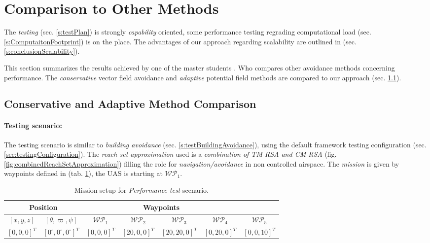 \section{Comparison to Other Methods}\label{s:OtherMethodsComparison}
\noindent The \emph{testing} (sec. \ref{s:testPlan}) is strongly \emph{capability} oriented, some performance testing regrading computational load (sec. \ref{s:ComputaitonFootprint}) is on the place. The advantages of our approach regarding scalability are outlined in (sec. \ref{s:conclusionScalability}).

This section summarizes the results achieved by one of the master students \cite{hrdlik2018}. Who compares other avoidance methods concerning performance. The  \emph{conservative }vector field avoidance \cite{borenstein1991vector} and \emph{adaptive} potential field \cite{koren1991potential} methods are compared to our approach (sec. \ref{s:conservativeComparison}).

\subsection{Conservative and Adaptive Method Comparison}\label{s:conservativeComparison}
\paragraph{Testing scenario:} The testing scenario is similar to \emph{building avoidance} (sec. \ref{s:testBuildingAvoidance}), using the default framework testing configuration (sec. \ref{sec:testingConfiguration}). The \emph{reach set approximation} used is a \emph{combination of TM-RSA and CM-RSA} (fig. \ref{fig:combinedReachSetApproximation}) filling the role for \emph{navigation/avoidance} in non controlled airspace. The \emph{mission} is given by waypoints defined in (tab. \ref{tab:missionSetupForPErformanceTest}), the UAS is starting at $\mathscr{WP}_1$.

\begin{table}[H]
	\centering
	\begin{tabular}{c|c||c|c|c|c|c}
		\multicolumn{2}{c||}{Position} & \multicolumn{4}{c}{Waypoints} \\\hline
		$[x,y,z]$     & $[\theta,\varpi,\psi]$           & $\mathscr{WP}_1$   & $\mathscr{WP}_2$   & $\mathscr{WP}_3$   & $\mathscr{WP}_4$    & $\mathscr{WP}_5$\\\hline\hline
		$[0,0,0]^T $       & $[0^\circ,0^\circ,0^\circ]^T$ & $[0,0,0]^T$ & $[20,0,0]^T$       & $[20,20,0]^T$       & $[0,20,0]^T$       & $[0,0,10]^T$       
	\end{tabular}
	\caption{Mission setup for \emph{Performance test} scenario.}
	\label{tab:missionSetupForPErformanceTest}
\end{table}

